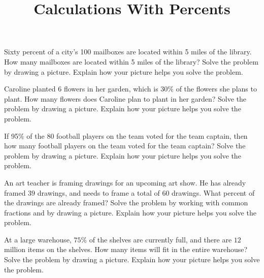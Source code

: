 \documentclass{ximera}
\title{Calculations With Percents}
\begin{document}
\begin{abstract}\end{abstract}
\maketitle




\begin{problem}
 Sixty percent of a city's 100 mailboxes are located within 5 miles of the library.  How many mailboxes are located within 5 miles of the library?  Solve the problem by drawing a picture.  Explain how your picture helps you solve the problem. 
 
 

\vfill
\end{problem}
\begin{problem}

Caroline planted $6$ flowers in her garden, which is $30\%$ of the flowers she plans to plant. How many flowers does Caroline plan to plant in her garden? Solve the problem by drawing a picture.  Explain how your picture helps you solve the problem.  

\vfill
\end{problem}
\newpage





\begin{problem}
 If 95$\%$ of the 80 football players on the team voted for the team captain, then how many football players on the team voted for the team captain?  Solve the problem by drawing a picture.  Explain how your picture helps you solve the problem.  
 
 
 
 
 \vfill
\end{problem}




\begin{problem}
An art teacher is framing drawings for an upcoming art show. He has already framed $39$ drawings, and needs to frame a total of $60$ drawings. What percent of the drawings are already framed? Solve the problem by working with common fractions and by drawing a picture.  Explain how your picture helps you solve the problem.  

 
\vfill
\end{problem}





\begin{problem}

At a large warehouse, $75\%$ of the shelves are currently full, and there are $12$ million items on the shelves. How many items will fit in the entire warehouse? Solve the problem by drawing a picture.  Explain how your picture helps you solve the problem.  


\vfill
\end{problem}
\end{document}
